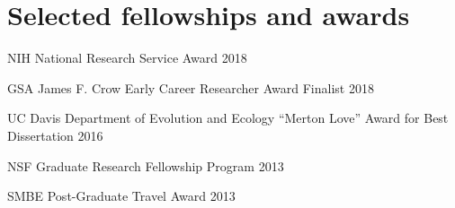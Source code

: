 \documentclass[letterpaper]{article}
\renewenvironment{itemize}{
  \begin{list}{}{
    \setlength{\leftmargin}{1.5em}
  }
}{
  \end{list}
}
\begin{document}
\section*{Selected fellowships and awards}
\begin {itemize}
\item NIH National Research Service Award 2018
  \item GSA James F. Crow Early Career Researcher Award Finalist 2018
\item UC Davis Department of Evolution and Ecology ``Merton Love'' Award for Best Dissertation 2016
\item NSF Graduate Research Fellowship Program 2013
\item SMBE Post-Graduate Travel Award 2013

\end{itemize}

\end{document}
